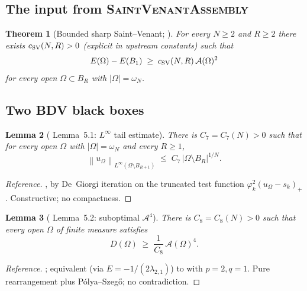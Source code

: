 \documentclass[11pt]{article}
\newtheorem{theorem}{Theorem}[section]
\newtheorem{lemma}[theorem]{Lemma}
\theoremstyle{definition}
\newcommand{\abs}[1]{\left|#1\right|}
\newcommand{\norm}[1]{\left\|#1\right\|}
\newcommand{\Fr}{\mathcal{A}}
\newcommand{\Om}{\Omega}
\begin{document}
\subsection*{The input from \textsc{SaintVenantAssembly}}

\begin{theorem}[Bounded sharp Saint--Venant; \cite{SVAssembly}]
\label{thm:SV-bounded}
For every $N\ge 2$ and $R\ge 2$ there exists $c_{\rm SV}(N,R)>0$
(explicit in upstream constants) such that
\begin{equation}\label{eq:SV-bounded}
   E(\Om)-E(B_{1})\;\ge\;c_{\rm SV}(N,R)\,\Fr(\Om)^{2}
\end{equation}
for every open $\Om\subset B_{R}$ with $|\Om|=\omega_{N}$.
\end{theorem}

\subsection*{Two BDV black boxes}

\begin{lemma}[\cite{BDV} Lemma~5.1: $L^{\infty}$ tail estimate]
\label{lem:51}
There is $C_{7}=C_{7}(N)>0$ such that for every open $\Om$ with
$|\Om|=\omega_{N}$ and every $R\ge 1$,
\begin{equation}\label{eq:51}
   \norm{u_{\Om}}_{L^{\infty}(\Om\setminus B_{R+1})}
   \;\le\;C_{7}\,\abs{\Om\setminus B_{R}}^{1/N}.
\end{equation}
\end{lemma}

\begin{proof}[Reference]
\cite[Lemma~5.1]{BDV}, by De~Giorgi iteration on the truncated test
function $\varphi_{k}^{2}(u_{\Om}-s_{k})_{+}$. Constructive; no
compactness.
\end{proof}

\begin{lemma}[\cite{BDV} Lemma~5.2: suboptimal $\Fr^{4}$]\label{lem:52}
There is $C_{8}=C_{8}(N)>0$ such that every open $\Om$ of finite
measure satisfies
\begin{equation}\label{eq:52}
   D(\Om)\;\ge\;\frac{1}{C_{8}}\,\Fr(\Om)^{4}.
\end{equation}
\end{lemma}

\begin{proof}[Reference]
\cite[Lemma~5.2]{BDV}; equivalent (via $E=-1/(2\lambda_{2,1})$) to
\cite[Thm.~1]{FMP-torsion} with $p=2,q=1$. Pure
rearrangement plus P\'olya--Szeg\H{o}; no contradiction.
\end{proof}
\end{document}
